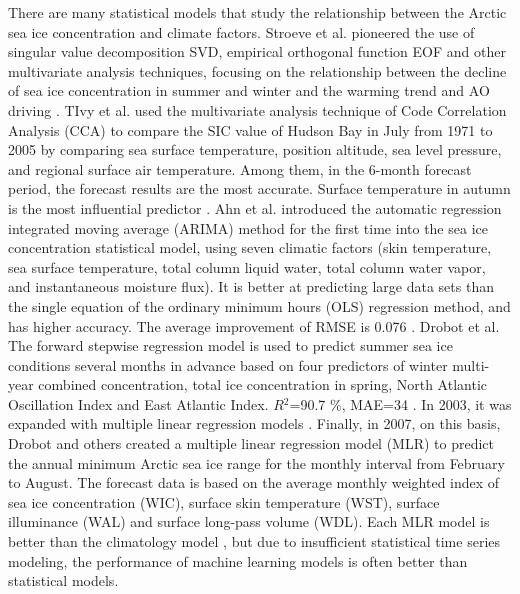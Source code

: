There are many statistical models that study the relationship between the Arctic sea ice concentration and climate factors. Stroeve et al. pioneered the use of singular value decomposition SVD, empirical orthogonal function EOF and other multivariate analysis techniques, focusing on the relationship between the decline of sea ice concentration in summer and winter and the warming trend and AO driving \cite{stroeve_frei_mccreight_ghatak_2008}. TIvy et al. used the multivariate analysis technique of Code Correlation Analysis (CCA) to compare the SIC value of Hudson Bay in July from 1971 to 2005 by comparing sea surface temperature, position altitude, sea level pressure, and regional surface air temperature. Among them, in the 6-month forecast period, the forecast results are the most accurate. Surface temperature in autumn is the most influential predictor \cite{tivy2011origins}. Ahn et al. introduced the automatic regression integrated moving average (ARIMA) method for the first time into the sea ice concentration statistical model, using seven climatic factors (skin temperature, sea surface temperature, total column liquid water, total column water vapor, and instantaneous moisture flux). It is better at predicting large data sets than the single equation of the ordinary minimum hours (OLS) regression method, and has higher accuracy. The average improvement of RMSE is 0.076 \cite{ahn2014statistical}. Drobot et al. The forward stepwise regression model is used to predict summer sea ice conditions several months in advance based on four predictors of winter multi-year combined concentration, total ice concentration in spring, North Atlantic Oscillation Index and East Atlantic Index. $R{^2}$=90.7 \%, MAE=34 \cite{drobot2002practical}. In 2003, it was expanded with multiple linear regression models \cite{drobot2003long}. Finally, in 2007, on this basis, Drobot and others created a multiple linear regression model (MLR) to predict the annual minimum Arctic sea ice range for the monthly interval from February to August. The forecast data is based on the average monthly weighted index of sea ice concentration (WIC), surface skin temperature (WST), surface illuminance (WAL) and surface long-pass volume (WDL). Each MLR model is better than the climatology model \cite{drobot2006long}, but due to insufficient statistical time series modeling, the performance of machine learning models is often better than statistical models.

